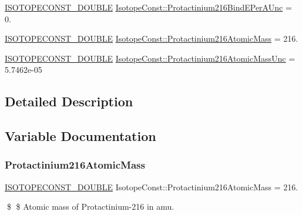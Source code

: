 \begin{DoxyCompactItemize}
\item 
\mbox{\hyperlink{group___isotope_const-_macros_ga8f45a7272ce02c0b4c65c44636ed719a}{I\+S\+O\+T\+O\+P\+E\+C\+O\+N\+S\+T\+\_\+\+D\+O\+U\+B\+LE}} \mbox{\hyperlink{group___isotope_const-_protactinium-_pa216_gae640484acbeee9d14aeebe3d0ab5bbdc}{Isotope\+Const\+::\+Protactinium216\+Bind\+E\+Per\+A\+Unc}} = 0.
\item 
\mbox{\hyperlink{group___isotope_const-_macros_ga8f45a7272ce02c0b4c65c44636ed719a}{I\+S\+O\+T\+O\+P\+E\+C\+O\+N\+S\+T\+\_\+\+D\+O\+U\+B\+LE}} \mbox{\hyperlink{group___isotope_const-_protactinium-_pa216_gadbef153d7ee77aec24573f6dd5b3bdaa}{Isotope\+Const\+::\+Protactinium216\+Atomic\+Mass}} = 216.
\item 
\mbox{\hyperlink{group___isotope_const-_macros_ga8f45a7272ce02c0b4c65c44636ed719a}{I\+S\+O\+T\+O\+P\+E\+C\+O\+N\+S\+T\+\_\+\+D\+O\+U\+B\+LE}} \mbox{\hyperlink{group___isotope_const-_protactinium-_pa216_ga89a5e163b63964277eb093dfd23ff12a}{Isotope\+Const\+::\+Protactinium216\+Atomic\+Mass\+Unc}} = 5.\+7462e-\/05
\end{DoxyCompactItemize}


\subsection{Detailed Description}


\subsection{Variable Documentation}
\mbox{\label{group___isotope_const-_protactinium-_pa216_gadbef153d7ee77aec24573f6dd5b3bdaa}} 
\subsubsection{\texorpdfstring{Protactinium216\+Atomic\+Mass}{Protactinium216AtomicMass}}
{\footnotesize\ttfamily \mbox{\hyperlink{group___isotope_const-_macros_ga8f45a7272ce02c0b4c65c44636ed719a}{I\+S\+O\+T\+O\+P\+E\+C\+O\+N\+S\+T\+\_\+\+D\+O\+U\+B\+LE}} Isotope\+Const\+::\+Protactinium216\+Atomic\+Mass = 216.}

\$ \$ Atomic mass of Protactinium-\/216 in amu. \mbox{\label{group___isotope_const-_protactinium-_pa216_ga89a5e163b63964277eb093dfd23ff12a}} 
